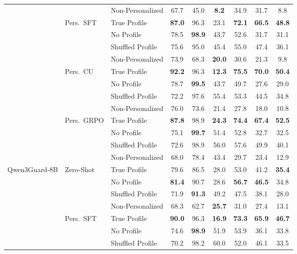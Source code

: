 \begin{table}[t]
{\begin{tabular}[t]{@{}lllcccccc@{}}
& & Non-Personalized & 67.7 & 45.0 & \textbf{8.2} & 34.9 & 31.7 & 8.8 \\
\cmidrule(lr){2-9}
& \multirow{4}{*}{Pers.\ SFT}
  & True Profile & \textbf{87.0} & 96.3 & 23.1 & \textbf{72.1} & \textbf{66.5} & \textbf{48.8} \\
& & No Profile & 78.5 & \textbf{98.9} & 43.7 & 52.6 & 31.7 & 31.1 \\
& & Shuffled Profile & 75.6 & 95.0 & 45.4 & 55.0 & 47.4 & 36.1 \\
& & Non-Personalized & 73.9 & 68.3 & \textbf{20.0} & 30.6 & 21.3 & 9.8 \\
\cmidrule(lr){2-9}
& \multirow{4}{*}{Pers.\ CU}
  & True Profile & \textbf{92.2} & 96.3 & \textbf{12.3} & \textbf{75.5} & \textbf{70.0} & \textbf{50.4} \\
& & No Profile & 78.7 & \textbf{99.5} & 43.7 & 49.7 & 27.6 & 29.0 \\
& & Shuffled Profile & 72.2 & 97.6 & 55.4 & 53.3 & 44.5 & 34.8 \\
& & Non-Personalized & 76.0 & 73.6 & 21.4 & 27.8 & 18.0 & 10.8 \\
\cmidrule(lr){2-9}
& \multirow{4}{*}{Pers.\ GRPO}
  & True Profile & \textbf{87.8} & 98.9 & \textbf{24.3} & \textbf{74.4} & \textbf{67.4} & \textbf{52.5} \\
& & No Profile & 75.1 & \textbf{99.7} & 51.4 & 52.8 & 32.7 & 32.5 \\
& & Shuffled Profile & 72.6 & 98.9 & 56.0 & 57.6 & 49.9 & 40.1 \\
& & Non-Personalized & 68.0 & 78.4 & 43.4 & 29.7 & 23.4 & 12.9 \\
\midrule
\multirow{16}{*}{Qwen3Guard-8B}
& \multirow{4}{*}{Zero-Shot}
  & True Profile & 79.6 & 86.5 & 28.0 & 53.0 & 41.2 & \textbf{35.4} \\
& & No Profile & \textbf{81.4} & 90.7 & 28.6 & \textbf{56.7} & \textbf{46.5} & 34.8 \\
& & Shuffled Profile & 71.9 & \textbf{91.3} & 49.2 & 47.5 & 38.1 & 28.0 \\
& & Non-Personalized & 68.3 & 62.7 & \textbf{25.7} & 31.0 & 27.4 & 13.1 \\
\cmidrule(lr){2-9}
& \multirow{4}{*}{Pers.\ SFT}
  & True Profile & \textbf{90.0} & 96.3 & \textbf{16.9} & \textbf{73.3} & \textbf{65.9} & \textbf{46.7} \\
& & No Profile & 74.6 & \textbf{98.9} & 51.9 & 53.9 & 36.1 & 33.8 \\
& & Shuffled Profile & 70.2 & 98.2 & 60.0 & 52.0 & 46.1 & 33.5 \\

\end{tabular}}
\end{table}
